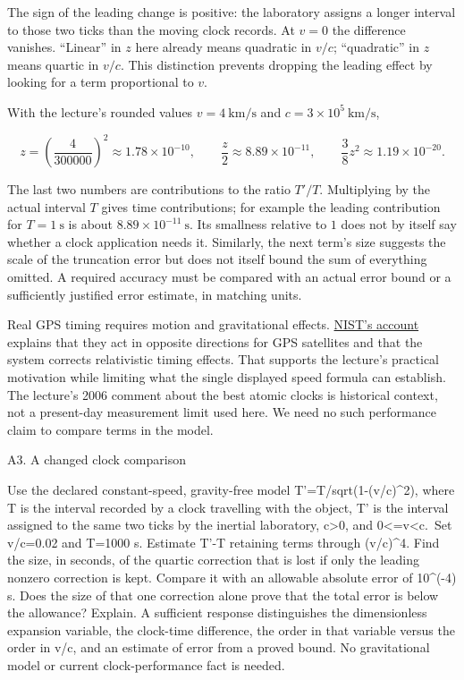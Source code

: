 \documentclass[
  11pt,
]{article}
\begin{document}
The sign of the leading change is positive: the laboratory assigns a
longer interval to those two ticks than the moving clock records. At
\(v=0\) the difference vanishes. ``Linear'' in \(z\) here already means
quadratic in \(v/c\); ``quadratic'' in \(z\) means quartic in \(v/c\).
This distinction prevents dropping the leading effect by looking for a
term proportional to \(v\).

With the lecture's rounded values \(v=4\ \mathrm{km/s}\) and
\(c=3\times10^5\ \mathrm{km/s}\),

\[z=\left(\frac4{300000}\right)^2\approx1.78\times10^{-10},\qquad \frac z2\approx8.89\times10^{-11},\qquad \frac38z^2\approx1.19\times10^{-20}.\]

The last two numbers are contributions to the ratio \(T'/T\).
Multiplying by the actual interval \(T\) gives time contributions; for
example the leading contribution for \(T=1\ \mathrm{s}\) is about
\(8.89\times10^{-11}\ \mathrm{s}\). Its smallness relative to \(1\) does
not by itself say whether a clock application needs it. Similarly, the
next term's size suggests the scale of the truncation error but does not
itself bound the sum of everything omitted. A required accuracy must be
compared with an actual error bound or a sufficiently justified error
estimate, in matching units.

Real GPS timing requires motion and gravitational effects.
\href{https://www.nist.gov/atomic-clocks/a-powerful-tool-for-science/putting-einstein-test}{NIST's
account} explains that they act in opposite directions for GPS
satellites and that the system corrects relativistic timing effects.
That supports the lecture's practical motivation while limiting what the
single displayed speed formula can establish. The lecture's 2006 comment
about the best atomic clocks is historical context, not a present-day
measurement limit used here. We need no such performance claim to
compare terms in the model.

A3. A changed clock comparison

Use the declared constant-speed, gravity-free model
T'=T/sqrt(1-(v/c)\^{}2), where T is the interval recorded by a clock
travelling with the object, T' is the interval assigned to the same two
ticks by the inertial laboratory, c\textgreater0, and
0\textless=v\textless c.~Set v/c=0.02 and T=1000 s. Estimate T'-T
retaining terms through (v/c)\^{}4. Find the size, in seconds, of the
quartic correction that is lost if only the leading nonzero correction
is kept. Compare it with an allowable absolute error of 10\^{}(-4) s.
Does the size of that one correction alone prove that the total error is
below the allowance? Explain. A sufficient response distinguishes the
dimensionless expansion variable, the clock-time difference, the order
in that variable versus the order in v/c, and an estimate of error from
a proved bound. No gravitational model or current clock-performance fact
is needed.
\end{document}
